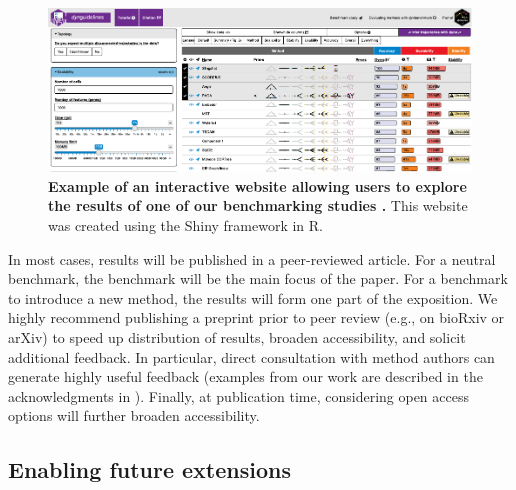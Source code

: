 \begin{figure}[htb!]
	\centering
	\includegraphics[width=\hugefigure]{fig/essential_guidelines_figure3} 
	\caption{\textbf{Example of an interactive website allowing users to explore the results of one of our benchmarking studies \cite{saelens_comparisonsinglecelltrajectory_2019}.} This website was created using the Shiny framework in R.}
	\label{fig:fig3_interactive}
\end{figure}

In most cases, results will be published in a peer-reviewed article. For a neutral benchmark, the benchmark will be the main focus of the paper. For a benchmark to introduce a new method, the results will form one part of the exposition. We highly recommend publishing a preprint prior to peer review (e.g., on bioRxiv or arXiv) to speed up distribution of results, broaden accessibility, and solicit additional feedback. In particular, direct consultation with method authors can generate highly useful feedback (examples from our work are described in the acknowledgments in \cite{lindgreen_evaluationaccuracyspeed_2016,freyhult_exploringgenomicdark_2007}). Finally, at publication time, considering open access options will further broaden accessibility.

\subsection{Enabling future extensions}

